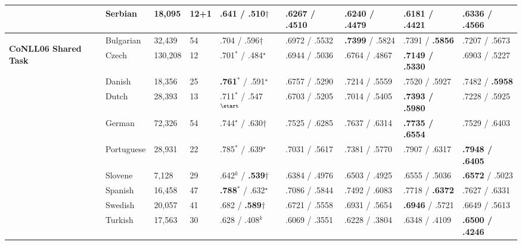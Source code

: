 \begin{table}[h]
\begin{flushleft}
\begin{tabular}{|l|l|l|l|l|l|l|l|l|}
        & Serbian    & 18,095  & 12+1 & .641 / .510$\dagger$        & .6267 / .4510 & .6240 / .4479 & .6181 / .4421     & \textbf{.6336 / .4566} \\
        \hline %
        \multirow{10}{*}{\begin{sideways}\textbf{CoNLL06 Shared Task}\end{sideways}}
        & Bulgarian  & 32,439  & 54   & .704 / .596$\dagger$        & .6972 / .5532 & \textbf{.7399} / .5824  & .7391 / \textbf{.5856}     & .7207 / .5673 \\
        & Czech      & 130,208 & 12   & .701$^*$ / .484$^\star$           & .6944 / .5036 & .6764 / .4867  & \textbf{.7149 / .5330}     & .6903 / .5227 \\
        & Danish     & 18,356  & 25   & \textbf{.761}$^*$ / .591$^\star$           & .6757 / .5290 & .7214 / .5559  & .7520 / .5927     & .7482 / \textbf{.5958} \\
        & Dutch      & 28,393  & 13   & .711$^*$ / .547$^\start$ & .6703 / .5205 & .7014 / .5405  & \textbf{.7393 / .5980}     & .7228 / .5925 \\
        & German     & 72,326  & 54   & .744$^\star$ / .630$\dagger$& .7525 / .6285 & .7637 / .6314  & \textbf{.7735 / .6554}     & .7529 / .6403 \\
        & Portuguese & 28,931  & 22   & .785$^*$ / .639$^\star$           & .7031 / .5617 & .7381 / .5770  & .7907 / .6317     & \textbf{.7948 / .6405} \\
        & Slovene    & 7,128   & 29   & .642$^k$ / \textbf{.539}$\dagger$    & .6384 / .4976 & .6503 / .4925  & .6555 / .5036     & \textbf{.6572} / .5023 \\
        & Spanish    & 16,458  & 47   & \textbf{.788}$^*$ / .632$^\star$          & .7086 / .5844 & .7492 / .6083  & .7718 / \textbf{.6372}     & .7627 / .6331 \\
        & Swedish    & 20,057  & 41   & .682 / \textbf{.589}$\dagger$        & .6721 / .5558 & .6931 / .5654  & \textbf{.6946} / .5721     & .6649 / .5613 \\
        & Turkish    & 17,563  & 30   & .628 / .408$^k$        & .6069 / .3551 & .6228 / .3804  & .6348 / .4109     & \textbf{.6500 / .4246} \\ \hline %
    \end{tabular}
  \end{flushleft}
\end{table}


